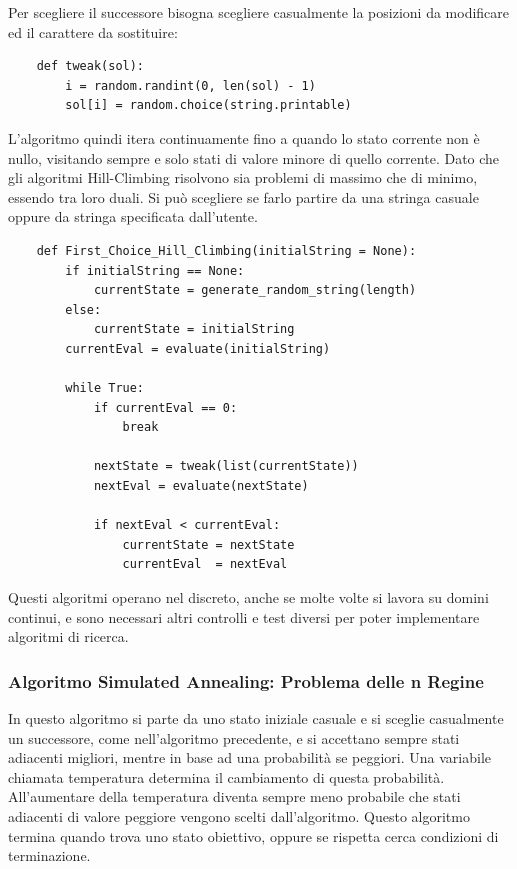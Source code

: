 \documentclass{article}
\numberwithin{equation}{subsection}
\begin{document}
Per scegliere il successore bisogna scegliere casualmente la posizioni da modificare ed il carattere da sostituire:
\begin{verbatim}
    def tweak(sol):
        i = random.randint(0, len(sol) - 1)
        sol[i] = random.choice(string.printable)
\end{verbatim}

L'algoritmo quindi itera continuamente fino a quando lo stato corrente non è nullo, visitando sempre e solo stati di valore minore di quello corrente. Dato che gli algoritmi Hill-Climbing risolvono sia problemi di 
massimo che di minimo, essendo tra loro duali. Si può scegliere se farlo partire da una stringa casuale oppure da stringa specificata dall'utente. 
\begin{verbatim}
    def First_Choice_Hill_Climbing(initialString = None):
        if initialString == None:
            currentState = generate_random_string(length)
        else:
            currentState = initialString
        currentEval = evaluate(initialString)

        while True:
            if currentEval == 0:
                break
            
            nextState = tweak(list(currentState))
            nextEval = evaluate(nextState)

            if nextEval < currentEval:
                currentState = nextState
                currentEval  = nextEval
\end{verbatim}

Questi algoritmi operano nel discreto, anche se molte volte si lavora su domini continui, e sono necessari altri controlli e test diversi per poter implementare algoritmi di ricerca. 

\subsubsection{Algoritmo Simulated Annealing: Problema delle n Regine}

In questo algoritmo si parte da uno stato iniziale casuale e si sceglie casualmente un successore, come nell'algoritmo precedente, e si accettano sempre stati adiacenti migliori, mentre in base ad una probabilità 
se peggiori. Una variabile chiamata temperatura determina il cambiamento di questa probabilità. All'aumentare della temperatura diventa sempre meno probabile che stati adiacenti di valore peggiore vengono 
scelti dall'algoritmo. Questo algoritmo termina quando trova uno stato obiettivo, oppure se rispetta cerca condizioni di terminazione. 
\end{document}
